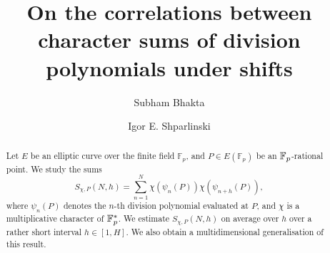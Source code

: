 \documentclass[12pt]{amsart}
\begin{document}
\def\Tr{{\mathrm{Tr}}}
\def\Nm{{\mathrm{Nm}}}
\def\Im{{\mathrm{Im}}}

\def \oF {\overline \F}

\newcommand{\pfrac}[2]{{\left(\frac{#1}{#2}\right)}}


\def \Prob{{\mathrm {}}}
\def\e{\mathbf{e}}
\def\ep{{\mathbf{\,e}}_p}
\def\epp{{\mathbf{\,e}}_{p^2}}
\def\em{{\mathbf{\,e}}_m}

\def\Res{\mathrm{Res}}
\def\Orb{\mathrm{Orb}}

\def\vec#1{\mathbf{#1}}
\def \va{\vec{a}}
\def \vb{\vec{b}}
\def \vm{\vec{m}}
\def \vu{\vec{u}}
\def \vv{\vec{v}}
\def \vx{\vec{x}}
\def \vy{\vec{y}}
\def \vz{\vec{z}}
\def\flp#1{{\left\langle#1\right\rangle}_p}
\def\T {\mathsf {T}}

\def\sfG {\mathsf {G}}
\def\sfK {\mathsf {K}}

\def\mand{\qquad\mbox{and}\qquad}


 

\title[Character sums with elliptic sequences]
{On the correlations between character sums of division polynomials under shifts}

 


\author{Subham Bhakta}
\address{School of Mathematics and Statistics, University of New South Wales, Sydney, NSW 2052, Australia.} 

\author{Igor E. Shparlinski}
\address{School of Mathematics and Statistics, University of New South Wales, Sydney, NSW 2052, Australia.} 

 


\begin{abstract}
Let $E$ be an elliptic curve over the finite field $\mathbb{F}_p$, and $P \in E(\mathbb{F}_p)$ be an ${\mathbb F}_p$-rational point. We study the sums
\[
S_{\chi,P}(N,h) = \sum_{n=1}^N \chi(\psi_n(P)) \chi(\psi_{n+h}(P)),
\]
where $\psi_n(P)$ denotes the $n$-th division polynomial evaluated at $P$, and $\chi$ is a multiplicative character of ${\mathbb F}_p^{*}$. We estimate $S_{\chi,P}(N,h)$ on average over $h$ over 
a rather short interval $h \in [1, H]$. We also obtain a multidimensional generalisation of this result. 
\end{abstract} 


\maketitle
\tableofcontents
\end{document}
